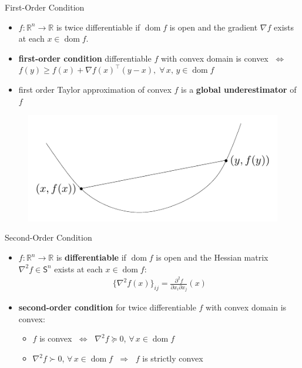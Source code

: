 \documentclass[10pt,handout]{beamer}
\newcommand{\ds}{\displaystyle}
\newcommand{\ie}{\;\Longrightarrow\;}
\newcommand{\ifff}{\;\Longleftrightarrow\;}
\DeclareMathOperator*{\dom}{dom}
\theoremstyle{definition}
\begin{document}
\begin{frame}{First-Order Condition}
  \begin{itemize}
    \item $f:\mathbb{R}^n\to\mathbb{R}$ is twice differentiable if $\dom f$ is open and the gradient $\nabla f$ exists at each $x\in\dom f$.
    \item {\bf first-order condition} differentiable $f$ with convex domain is convex $\ifff$ $\ds f(y) \geqslant f(x) + \nabla f(x)^\top(y - x),\;\forall\,x,\,y\in\dom f$
    \item first order Taylor approximation of convex $f$ is a {\bf global underestimator} of $f$
  \end{itemize}
  \begin{figure}[!htbp]
    \centering
    \includegraphics[scale=1,page=2]{fig/note06/03.pdf}
  \end{figure}
\end{frame}

\begin{frame}{Second-Order Condition}
  \begin{itemize}
    \item $f:\mathbb{R}^n\to\mathbb{R}$ is {\bf differentiable} if $\dom f$ is open and the Hessian matrix $\nabla^2 f\in\mathsf{S}^n$ exists at each $x\in\dom f$: 
      \begin{align*}
        \big\{\nabla^2 f(x)\big\}_{ij} = \frac{\partial^2 f}{\partial x_i\partial x_j}(x)
      \end{align*}
    \item {\bf second-order condition} for twice differentiable $f$ with convex domain is convex: 
      \begin{itemize}
        \item $f$ is convex $\ifff$ $\nabla^2 f\succcurlyeq 0$, $\forall\,x\in\dom f$
        \item $\nabla^2 f\succ 0$, $\forall\,x\in\dom f$ $\ie$ $f$ is strictly convex
      \end{itemize}
  \end{itemize}
\end{frame}
\end{document}
